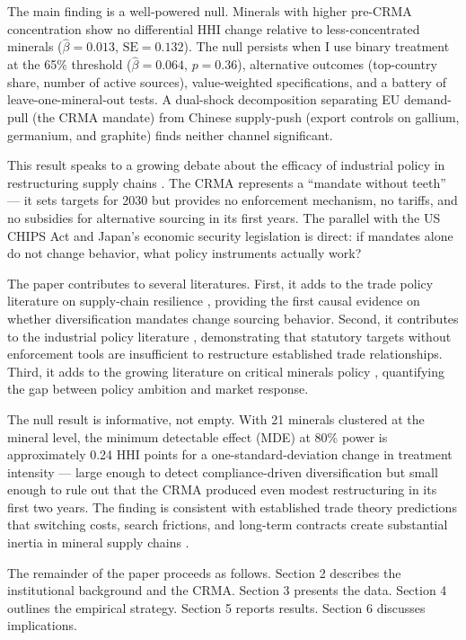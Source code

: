 \documentclass[12pt]{article}
\begin{document}
The main finding is a well-powered null. Minerals with higher pre-CRMA concentration show no differential HHI change relative to less-concentrated minerals ($\hat{\beta} = 0.013$, $\text{SE} = 0.132$). The null persists when I use binary treatment at the 65\% threshold ($\hat{\beta} = 0.064$, $p = 0.36$), alternative outcomes (top-country share, number of active sources), value-weighted specifications, and a battery of leave-one-mineral-out tests. A dual-shock decomposition separating EU demand-pull (the CRMA mandate) from Chinese supply-push (export controls on gallium, germanium, and graphite) finds neither channel significant.

This result speaks to a growing debate about the efficacy of industrial policy in restructuring supply chains \citep{evenett2022trade}. The CRMA represents a ``mandate without teeth'' --- it sets targets for 2030 but provides no enforcement mechanism, no tariffs, and no subsidies for alternative sourcing in its first years. The parallel with the US CHIPS Act and Japan's economic security legislation is direct: if mandates alone do not change behavior, what policy instruments actually work?

The paper contributes to several literatures. First, it adds to the trade policy literature on supply-chain resilience \citep{antras2020globalization, grossman2020supply}, providing the first causal evidence on whether diversification mandates change sourcing behavior. Second, it contributes to the industrial policy literature \citep{evenett2022trade}, demonstrating that statutory targets without enforcement tools are insufficient to restructure established trade relationships. Third, it adds to the growing literature on critical minerals policy \citep{iea2023critical, oecd2023minerals}, quantifying the gap between policy ambition and market response.

The null result is informative, not empty. With 21 minerals clustered at the mineral level, the minimum detectable effect (MDE) at 80\% power is approximately 0.24 HHI points for a one-standard-deviation change in treatment intensity --- large enough to detect compliance-driven diversification but small enough to rule out that the CRMA produced even modest restructuring in its first two years. The finding is consistent with established trade theory predictions that switching costs, search frictions, and long-term contracts create substantial inertia in mineral supply chains \citep{barrot2016input, carvalho2021supply}.

The remainder of the paper proceeds as follows. Section 2 describes the institutional background and the CRMA. Section 3 presents the data. Section 4 outlines the empirical strategy. Section 5 reports results. Section 6 discusses implications.
\end{document}
